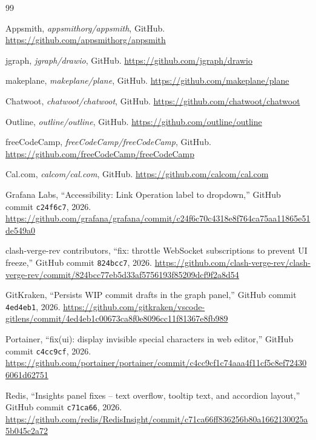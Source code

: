 \documentclass{article}
\begin{document}
\begin{thebibliography}{99}

Appsmith, \textit{appsmithorg/appsmith}, GitHub.
\url{https://github.com/appsmithorg/appsmith}

jgraph, \textit{jgraph/drawio}, GitHub.
\url{https://github.com/jgraph/drawio}

makeplane, \textit{makeplane/plane}, GitHub.
\url{https://github.com/makeplane/plane}

Chatwoot, \textit{chatwoot/chatwoot}, GitHub.
\url{https://github.com/chatwoot/chatwoot}

Outline, \textit{outline/outline}, GitHub.
\url{https://github.com/outline/outline}

freeCodeCamp, \textit{freeCodeCamp/freeCodeCamp}, GitHub.
\url{https://github.com/freeCodeCamp/freeCodeCamp}

Cal.com, \textit{calcom/cal.com}, GitHub.
\url{https://github.com/calcom/cal.com}

{Grafana Labs},
``Accessibility: Link Operation label to dropdown,''
GitHub commit \texttt{c24f6c7}, 2026.
\url{https://github.com/grafana/grafana/commit/c24f6c70c4318e8f764ca75aa11865e51de549a0}

{clash-verge-rev contributors},
``fix: throttle WebSocket subscriptions to prevent UI freeze,''
GitHub commit \texttt{824bcc7}, 2026.
\url{https://github.com/clash-verge-rev/clash-verge-rev/commit/824bcc77eb5d33af5756193f85209dcf9f2a8d54}

{GitKraken},
``Persists WIP commit drafts in the graph panel,''
GitHub commit \texttt{4ed4eb1}, 2026.
\url{https://github.com/gitkraken/vscode-gitlens/commit/4ed4eb1c00673ca8f0e8096cc11f81367e8fb989}

{Portainer},
``fix(ui): display invisible special characters in web editor,''
GitHub commit \texttt{c4cc9cf}, 2026.
\url{https://github.com/portainer/portainer/commit/c4cc9cf1c74aaa4f11cf5c8ef724306061d62751}

{Redis},
``Insights panel fixes -- text overflow, tooltip text, and accordion layout,''
GitHub commit \texttt{c71ca66}, 2026.
\url{https://github.com/redis/RedisInsight/commit/c71ca66ff836256b80a1662130025a5b045c2a72}


\end{thebibliography}
\end{document}
